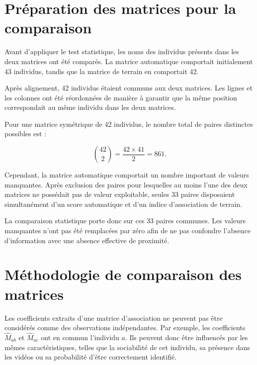 \documentclass[11pt,a4paper]{report}
\begin{document}
\section{Préparation des matrices pour la comparaison}
\label{sec:preparation_matrices}

Avant d'appliquer le test statistique, les noms des individus présents
dans les deux matrices ont été comparés. La matrice automatique
comportait initialement 43 individus, tandis que la matrice de terrain
en comportait 42.

Après alignement, 42 individus étaient communs aux deux matrices. Les
lignes et les colonnes ont été réordonnées de manière à garantir que la
même position correspondait au même individu dans les deux matrices.

Pour une matrice symétrique de 42 individus, le nombre total de paires
distinctes possibles est :

\begin{equation}
    \binom{42}{2}
    =
    \frac{42 \times 41}{2}
    =
    861.
\end{equation}

Cependant, la matrice automatique comportait un nombre important de
valeurs manquantes. Après exclusion des paires pour lesquelles au moins
l'une des deux matrices ne possédait pas de valeur exploitable, seules
33 paires disposaient simultanément d'un score automatique et d'un
indice d'association de terrain.

La comparaison statistique porte donc sur ces 33 paires communes. Les
valeurs manquantes n'ont pas été remplacées par zéro afin de ne pas
confondre l'absence d'information avec une absence effective de
proximité.


\section{Méthodologie de comparaison des matrices}
\label{sec:methode_comparaison}

Les coefficients extraits d'une matrice d'association ne peuvent pas
être considérés comme des observations indépendantes. Par exemple, les
coefficients $\hat{M}_{ab}$ et $\hat{M}_{ac}$ ont en commun l'individu
$a$. Ils peuvent donc être influencés par les mêmes caractéristiques,
telles que la sociabilité de cet individu, sa présence dans les vidéos
ou sa probabilité d'être correctement identifié.
\end{document}
